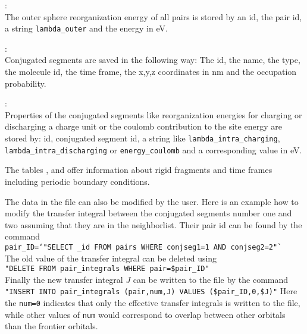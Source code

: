 \sqlpairproperties:\\
The outer sphere reorganization energy of all pairs is stored by an id, the pair id, a string \texttt{lambda\_outer} and the energy in eV.

\sqlconjsegs:\\
Conjugated segments are saved in the following way: The id, the name, the type, the molecule id, the time frame, the x,y,z coordinates in nm and the occupation probability.

\sqlconjsegproperties:\\
Properties of the conjugated segments like reorganization energies for charging or discharging a charge unit or the coulomb contribution to the site energy are stored by: id, conjugated segment id, a string like \texttt{lambda\_intra\_charging}, \texttt{lambda\_intra\_discharging} or \texttt{energy\_coulomb} and a corresponding value in eV.

The tables \sqlrigidfragproperties, \sqlrigidfrags and \sqlframes offer information about rigid fragments and time frames including periodic boundary conditions.


The data in the \sqlstate file can also be modified by the user. Here is an example how to modify the transfer integral between the conjugated segments number one and two assuming that they are in the neighborlist.
Their pair id can be found by the command \\ 
{\small \texttt{pair\_ID=`}\sqlite \sqlstate \texttt{"SELECT \_id FROM pairs WHERE conjseg1=1 AND conjseg2=2"`}} \\
The old value of the transfer integral can be deleted using\\
{\small \sqlite \sqlstate \texttt{"DELETE FROM pair\_integrals WHERE pair=\$pair\_ID"}}\\
Finally the new transfer integral $J$ can be written to the \sqlstate file by the command\\
{\small \sqlite \sqlstate \texttt{"INSERT INTO pair\_integrals (pair,num,J) VALUES (\$pair\_ID,0,\$J)"}}
Here the \texttt{num=0} indicates that only the effective transfer integrals is written to the file, while other values of \texttt{num}
would correspond to overlap between other orbitals than the frontier orbitals.

